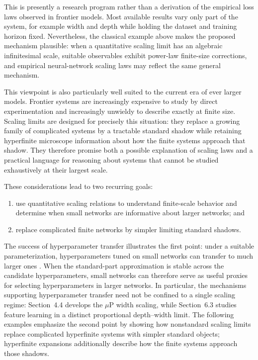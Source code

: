 This is presently a research program rather than a derivation of the empirical loss laws observed in frontier models. Most available results vary only part of the system, for example width and depth while holding the dataset and training horizon fixed. Nevertheless, the classical example above makes the proposed mechanism plausible: when a quantitative scaling limit has an algebraic infinitesimal scale, suitable observables exhibit power-law finite-size corrections, and empirical neural-network scaling laws may reflect the same general mechanism.

This viewpoint is also particularly well suited to the current era of ever larger models. Frontier systems are increasingly expensive to study by direct experimentation and increasingly unwieldy to describe exactly at finite size. Scaling limits are designed for precisely this situation: they replace a growing family of complicated systems by a tractable standard shadow while retaining hyperfinite microscope information about how the finite systems approach that shadow. They therefore promise both a possible explanation of scaling laws and a practical language for reasoning about systems that cannot be studied exhaustively at their largest scale.

These considerations lead to two recurring goals:
\begin{enumerate}
\item use quantitative scaling relations to understand finite-scale behavior and determine when small networks are informative about larger networks; and
\item replace complicated finite networks by simpler limiting standard shadows.
\end{enumerate}

The success of hyperparameter transfer illustrates the first point: under a suitable parameterization, hyperparameters tuned on small networks can transfer to much larger ones \cite{yang2022tensor}. When the standard-part approximation is stable across the candidate hyperparameters, small networks can therefore serve as useful proxies for selecting hyperparameters in larger networks. In particular, the mechanisms supporting hyperparameter transfer need not be confined to a single scaling regime: Section~4.4 develops the $\mu$P width scaling, while Section~6.3 studies feature learning in a distinct proportional depth--width limit. The following examples emphasize the second point by showing how nonstandard scaling limits replace complicated hyperfinite systems with simpler standard objects; hyperfinite expansions additionally describe how the finite systems approach those shadows.

